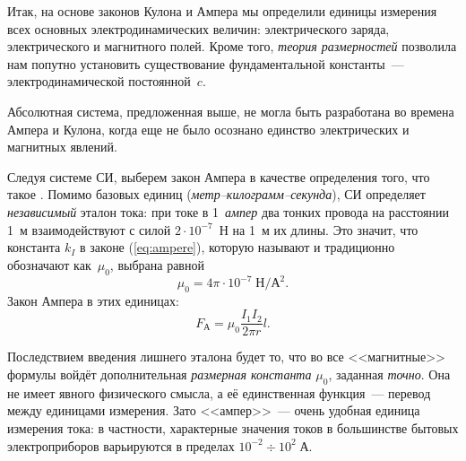 Итак, на основе законов Кулона и Ампера мы определили единицы измерения
всех основных электродинамических величин: электрического заряда,
электрического и магнитного полей. Кроме того, \emph{теория размерностей}
позволила нам попутно установить существование фундаментальной константы~---
электродинамической постоянной~$c$.


Абсолютная система, предложенная выше, не могла быть разработана во
времена Ампера и Кулона, когда еще не было осознано единство электрических
и магнитных явлений.

Следуя системе СИ, выберем закон Ампера в качестве определения того,
что такое . Помимо базовых единиц (\emph{метр--килограмм--секунда}),
СИ определяет \emph{независимый} эталон тока: при токе в 1~\emph{ампер} два
тонких провода на расстоянии 1~м взаимодействуют с силой $2\cdot10^{-7}$~Н
на 1~м их длины. Это значит, что константа $k_{I}$ в законе (\ref{eq:ampere}),
которую называют  и традиционно обозначают
как~$\mu_{0}$, выбрана равной
\[
\mu_{0}=4\pi\cdot10^{-7}\;\text{Н}/\text{А}^{2}.
\]
Закон Ампера в этих единицах:
\begin{equation}
F_{\text{А}}=\mu_{0}\frac{I_{1}I_{2}}{2\pi r}l.
\end{equation}

Последствием введения лишнего эталона будет то, что во все <<магнитные>> формулы
войдёт дополнительная \emph{размерная константа} $\mu_0$, заданная \emph{точно}.
Она не имеет явного физического смысла, а её единственная функция~---
перевод между единицами измерения. Зато <<ампер>>~--- очень удобная
единица измерения тока: в частности, характерные значения токов в
большинстве бытовых электроприборов варьируются в пределах $10^{-2}\div10^2\;\text{А}$.

